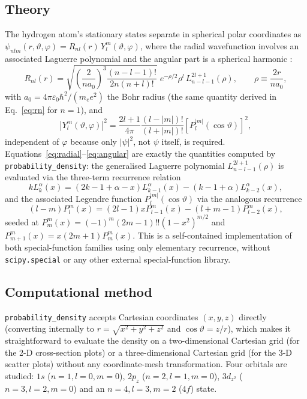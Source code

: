 \documentclass[11pt]{article}
\begin{document}
\subsection{Theory}
The hydrogen atom's stationary states separate in spherical polar coordinates as $\psi_{nlm}(r,\vartheta,\varphi) = R_{nl}(r)\,Y_l^m(\vartheta,\varphi)$, where the radial wavefunction involves an associated Laguerre polynomial and the angular part is a spherical harmonic \cite{griffiths}:
\begin{equation}
R_{nl}(r) = \sqrt{\left(\frac{2}{na_0}\right)^3\frac{(n-l-1)!}{2n(n+l)!}}\;e^{-\rho/2}\rho^l\,L_{n-l-1}^{2l+1}(\rho), \qquad \rho \equiv \frac{2r}{na_0}, \label{eq:radial}
\end{equation}
with $a_0=4\pi\varepsilon_0\hbar^2/(m_ee^2)$ the Bohr radius (the same quantity derived in Eq.~\eqref{eq:rn} for $n=1$), and
\begin{equation}
|Y_l^m(\vartheta,\varphi)|^2 = \frac{2l+1}{4\pi}\frac{(l-|m|)!}{(l+|m|)!}\left[P_l^{|m|}(\cos\vartheta)\right]^2, \label{eq:angular}
\end{equation}
independent of $\varphi$ because only $|\psi|^2$, not $\psi$ itself, is required. Equations~\eqref{eq:radial}--\eqref{eq:angular} are exactly the quantities computed by \texttt{probability\_density}: the generalised Laguerre polynomial $L_{n-l-1}^{2l+1}(\rho)$ is evaluated via the three-term recurrence relation
\begin{equation}
kL_k^\alpha(x) = (2k-1+\alpha-x)L_{k-1}^\alpha(x) - (k-1+\alpha)L_{k-2}^\alpha(x),
\end{equation}
and the associated Legendre function $P_l^{|m|}(\cos\vartheta)$ via the analogous recurrence
\begin{equation}
(l-m)P_l^m(x) = (2l-1)xP_{l-1}^m(x) - (l+m-1)P_{l-2}^m(x),
\end{equation}
seeded at $P_m^m(x)=(-1)^m(2m-1)!!(1-x^2)^{m/2}$ and $P_{m+1}^m(x)=x(2m+1)P_m^m(x)$. This is a self-contained implementation of both special-function families using only elementary recurrence, without \texttt{scipy.special} or any other external special-function library.

\subsection{Computational method}
\texttt{probability\_density} accepts Cartesian coordinates $(x,y,z)$ directly (converting internally to $r=\sqrt{x^2+y^2+z^2}$ and $\cos\vartheta=z/r$), which makes it straightforward to evaluate the density on a two-dimensional Cartesian grid (for the 2-D cross-section plots) or a three-dimensional Cartesian grid (for the 3-D scatter plots) without any coordinate-mesh transformation. Four orbitals are studied: $1s$ ($n{=}1,l{=}0,m{=}0$), $2p_z$ ($n{=}2,l{=}1,m{=}0$), $3d_{z^2}$ ($n{=}3,l{=}2,m{=}0$) and an $n=4,l=3,m=2$ ($4f$) state.
\end{document}
